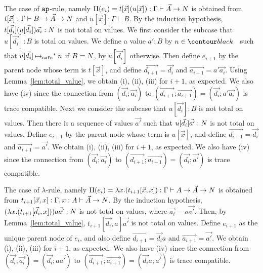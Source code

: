 \documentclass{article}
\newenvironment{proof}[1][Proof]{\begin{trivlist}
\item[\hskip \labelsep {\bfseries #1}]}{\end{trivlist}}
\begin{document}
\begin{proof}
  The case of ${\tt ap}$-rule, namely 
  $\Pi(e_i) = t[\vec{x}](u[\vec{x}]):\Gamma\vdash \vec{A}\rightarrow{N}$ is obtained from
  $t[\vec{x}]:\Gamma\vdash B \rightarrow \vec{A}\rightarrow{N}$ 
and $u[\vec{x}]:\Gamma\vdash B$.
  By the induction hypothesis, $t[\vec{d_i}](u[\vec{d_i}])\vec{a_i}:{N}$ is not total on values.
  We first consider the subcase that $u[\vec{d_i}]:B$ is total on values.
  We define a value $a':B$ by $n\in\Nat$ such that $u[\vec{d_i}] \mathbin{\mathbin{\mapsto}_{\hbox{\scriptsize \tt safe}}}^* n$ if $B={N}$,
  by $u[\vec{d_i}]$ otherwise.
  Then define $e_{i+1}$ by the parent node whose term is $t[\vec{x}]$,
  and define $\vec{d_{i+1}} = \vec{d_i}$ and $\vec{a_{i+1}} = a'\vec{a_i}$. 
  Using Lemma~\ref{lem:total_value}, we obtain (i), (ii), (iii) for $i+1$, as expected. 
  We also have (iv) since the connection from 
  $(\vec{d_i};\vec{a_i})$ to $(\vec{d_{i+1}};\vec{a_{i+1}}) = (\vec{d_i};a'\vec{a_i})$ is
  trace compatible. 
  Next we consider the subcase that $u[\vec{d_i}]:B$ is not total on values.
  Then there is a sequence of values $\vec{a'}$ such that $u[\vec{d_i}]\vec{a'}:{N}$ is not total on values.
  Define $e_{i+1}$ by the parent node whose term is $u[\vec{x}]$,
  and define $\vec{d_{i+1}} = \vec{d_i}$ and $\vec{a_{i+1}} = \vec{a'}$. 
  We obtain (i), (ii), (iii) for $i+1$, as expected.
  We also have (iv) since the connection from 
  $(\vec{d_i};\vec{a_i})$ to $(\vec{d_{i+1}};\vec{a_{i+1}}) = (\vec{d_i};\vec{a'})$ is
  trace compatible. 
  
  The case of $\lambda$-rule, namely
  $\Pi(e_i) = \lambda x.(t_{i+1}[\vec{x},x]):\Gamma\vdash A \rightarrow \vec{A} \rightarrow {N}$ is obtained from
  $t_{i+1}[\vec{x},x]:\Gamma,x:A\vdash \vec{A}\rightarrow{N}$.
  By the induction hypothesis, $(\lambda x.(t_{i+1}[\vec{d_i},x]))a\vec{a'}:{N}$ is not total on values,
  where $\vec{a_i} = a\vec{a'}$.
  Then, by Lemma~\ref{lem:total_value}, $t_{i+1}[\vec{d_i},a]\vec{a'}$ is not total on values. 
  Define $e_{i+1}$ as the unique parent node of $e_i$, and
  also define $\vec{d_{i+1}} = \vec{d_i}a$ and $\vec{a_{i+1}} = \vec{a'}$. 
  We obtain (i), (ii), (iii) for $i+1$, as expected.
  We also have (iv) since the connection from 
  $(\vec{d_i};\vec{a_i}) = (\vec{d_i};a\vec{a'})$ to $(\vec{d_{i+1}};\vec{a_{i+1}}) = (\vec{d_i}a;\vec{a'})$ is
  trace compatible. 
  

\end{proof}
\end{document}
